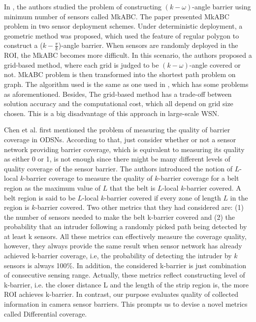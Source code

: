 In \cite{xu2016minimum}, the authors studied the problem of constructing $(k-\omega)$-angle barrier using minimum number of sensors called MkABC. The paper presented MkABC problem in two sensor deployment schemes. Under deterministic deployment, a geometric method was proposed, which used the feature of regular polygon to construct a ($k-\displaystyle\frac{\pi}{k}$)-angle barrier. When sensors are randomly deployed in the ROI, the MkABC becomes more difficult. In this scenario, the authors proposed a grid-based method, where each grid is judged to be $(k-\omega)$-angle covered or not. MkABC problem is then transformed into the shortest path problem on graph. The algorithm used is the same as one used in \cite{ma2012minimum}, which has some problems as aforementioned. Besides, The grid-based method has a trade-off between solution accuracy and the computational cost, which all depend on grid size chosen. This is a big disadvantage of this approach in large-scale WSN. 

Chen et al. \cite{chen2008measuring} first mentioned the problem of measuring the quality of barrier coverage in ODSNs. According to that, just consider whether or not a sensor network providing barrier coverage, which is equivalent to measuring its quality as either 0 or 1, is not enough since there might be many different levels of quality coverage of the sensor barrier. The authors introduced the notion of $L$-local $k$-barrier coverage to measure the quality of $k$-barrier coverage for a belt region as the maximum value of $L$ that the belt is $L$-local $k$-barrier covered. A belt region is said to be $L$-local $k$-barrier covered if every zone of length $L$ in the region is $k$-barrier covered. Two other metrics that they had considered are: (1) the number of sensors needed to make the belt k-barrier covered and (2) the probability that an intruder following a randomly picked path being detected by at least k sensors. All these metrics can effectively measure the coverage quality, however, they always provide the same result when sensor network has already achieved k-barrier coverage, i.e, the probability of detecting the intruder by $k$ sensors is always 100\%. In addition, the considered k-barrier is just combination of consecutive sensing range. Actually, these metrics reflect constructing level of k-barrier, i.e. the closer distance L and the length of the strip region is, the more ROI achieves k-barrier. In contrast, our purpose evaluates quality of collected information in camera sensor barriers. This prompts us to devise a novel metrics called Differential coverage.  


